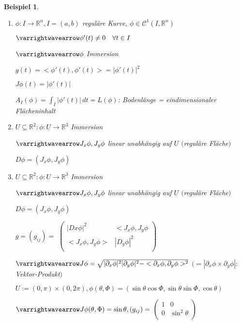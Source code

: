 \documentclass[11pt]{memoir}
\theoremstyle{changebreak}
\newtheorem{Beispiel}{Beispiel}[chapter]
\begin{document}


\begin{Beispiel}
\begin{enumerate}
	\item $\phi: I \rightarrow \mathbb R^n, I = (a, b)$ reguläre Kurve, $\phi \in \mathscr C^1(I, \mathbb R^n)$
	\par
	$\varrightwavearrow \phi'(t) \ne 0 \quad \forall t\in I $
	\par
	$\varrightwavearrow \phi$ Immersion
	\par
	$g(t) = <\phi'(t), \phi'(t) > = |\phi'(t)|^2$
	\par
	$J\phi(t) = |\phi'(t)|$
	\par
	$A_I(\phi) = \int_I |\phi'(t)|\, dt = L(\phi)$: Bodenlänge = eindimensionaler Flächeninhalt

	\item $U \subseteq \mathbb R^2: \phi: U \rightarrow \mathbb R^3$ Immersion
	\par
	$\varrightwavearrow J_x \phi, J_y \phi$ linear unabhängig auf $U$ $($reguläre Fläche$)$
	\par
	$D\phi = (J_x \phi, J_y \phi)$ \\

	\item $U \subseteq \mathbb R^2: \phi: U \rightarrow \mathbb R^3$ Immersion
	\par
	$\varrightwavearrow J_x \phi, J_y \phi$ linear unabhängig auf $U$ $($reguläre Fläche$)$
	\par
	$D\phi = (J_x \phi, J_y \phi)$
	\par
	$g= (g_{ij}) =$
	$\begin{pmatrix}
      		|Dx\phi|^2 & 	<J_x\phi, J_y\phi \\
      		<J_x\phi, J_y\phi> &  	|D_y\phi|^2 \\
	\end{pmatrix}$
	\par\bigskip
	$\varrightwavearrow J\phi = \sqrt{|\partial_x \phi|^2 |\partial_y \phi|^2 - <\partial_x\phi, \partial_y\phi>^2}$ $(= |\partial_x\phi \times \partial_y \phi|: $Vektor-Produkt$)$
	\par
	$U:= (0, \pi) \times (0, 2\pi), \phi(\theta, \Phi) = (\sin\theta\cos\Phi, \sin\theta\sin\Phi, \cos\theta)$
	\par
	$\varrightwavearrow J\phi(\theta, \Phi) = \sin\theta, (g_{ij}) = $
	$\begin{pmatrix}
		1 & 0 \\
		0 & \sin^2 \theta \\
	\end{pmatrix}$


\end{enumerate}
\end{Beispiel}
\end{document}

